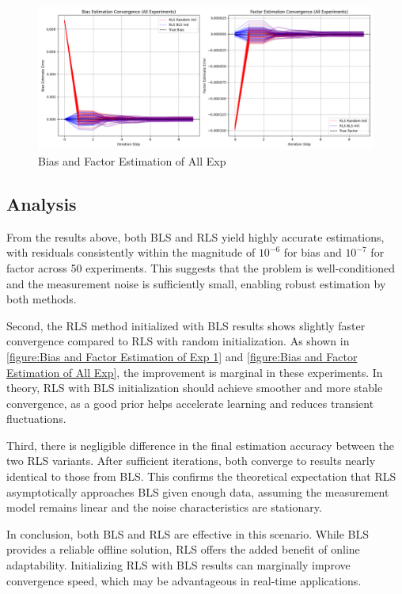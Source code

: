 \documentclass[openany,12pt,UTF8]{article}
\begin{document}
\begin{figure}[h]\centering
\includegraphics[width=\columnwidth]{figures/Bias and Factor Estimation of All Exp.png}
\caption{Bias and Factor Estimation of All Exp}
\label{figure:Bias and Factor Estimation of All Exp}
\end{figure}

\subsection{Analysis}
From the results above, both BLS and RLS yield highly accurate estimations, with residuals consistently within the magnitude of $10^{-6}$ for bias and $10^{-7}$ for factor across 50 experiments. This suggests that the problem is well-conditioned and the measurement noise is sufficiently small, enabling robust estimation by both methods.

Second, the RLS method initialized with BLS results shows slightly faster convergence compared to RLS with random initialization. As shown in \autoref{figure:Bias and Factor Estimation of Exp 1} and \autoref{figure:Bias and Factor Estimation of All Exp}, the improvement is marginal in these experiments. In theory, RLS with BLS initialization should achieve smoother and more stable convergence, as a good prior helps accelerate learning and reduces transient fluctuations.

Third, there is negligible difference in the final estimation accuracy between the two RLS variants. After sufficient iterations, both converge to results nearly identical to those from BLS. This confirms the theoretical expectation that RLS asymptotically approaches BLS given enough data, assuming the measurement model remains linear and the noise characteristics are stationary.

In conclusion, both BLS and RLS are effective in this scenario. While BLS provides a reliable offline solution, RLS offers the added benefit of online adaptability. Initializing RLS with BLS results can marginally improve convergence speed, which may be advantageous in real-time applications.
\end{document}

